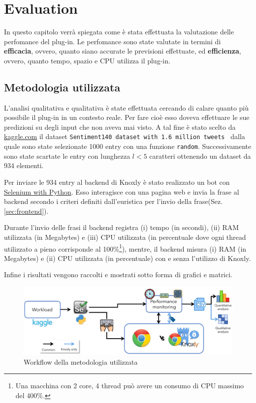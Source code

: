 \chapter{Evaluation}
In questo capitolo verrà spiegata come è stata effettuata la valutazione delle perfomance del plug-in. Le perfomance sono state valutate in termini di \textbf{efficacia}, ovvero, quanto siano accurate le previsioni effettuate, ed \textbf{efficienza}, ovvero, quanto tempo, spazio e CPU utilizza il plug-in.   

\section{Metodologia utilizzata}
\label{sec:metodologiaevaluation}
L'analisi qualitativa e qualitativa è state effettuata cercando di calare quanto più possibile il plug-in in un contesto reale. Per fare cioè esso doveva effettuare le sue predizioni su degli input che non aveva mai visto. A tal fine è stato scelto da \href{https://www.kaggle.com/}{kaggle.com} il dataset {\tt Sentiment140 dataset with 1.6 million tweets }\cite{sentiment140} dalla quale sono state selezionate 1000 entry con una funzione {\tt random}. Successivamente sono state scartate le entry con lunghezza $l<5$ caratteri ottenendo un dataset da 934 elementi.

Per inviare le 934 entry al backend di Knoxly è stato realizzato un bot con \href{https://selenium-python.readthedocs.io/}{Selenium with Python}. Esso interagisce con una pagina web e invia la frase al backend secondo i criteri definiti  dall'euristica per l'invio della frase(Sez. \ref{sec:frontend}).

Durante l'invio delle frasi il backend registra (i) tempo (in secondi), (ii) RAM utilizzata (in Megabytes) e (iii) CPU utilizzata (in percentuale dove ogni thread utilizzato a pieno corrisponde al 100\%\footnote{Una macchina con 2 core, 4 thread può avere un consumo di CPU massimo del 400\%.}), mentre, il backend misura (i) RAM (in Megabytes) e (ii) CPU utilizzata (in percentuale) con e senza l'utilizzo di Knoxly.

Infine i risultati vengono raccolti e mostrati sotto forma di grafici e matrici.

\begin{figure}[h!t]
    \centering
    \includegraphics[width=15cm]{Figure/grafici/evaluation_cropped.pdf}
    \caption{Workflow della metodologia utilizzata}
    \label{fig:methodeval}
\end{figure}
\FloatBarrier

